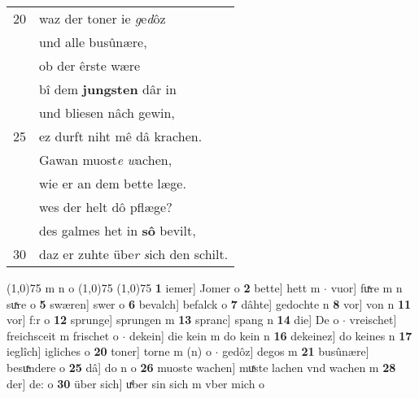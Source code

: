 \documentclass[8pt,a4paper,notitlepage]{article}
\begin{document}
\begin{table}[ht]
\begin{minipage}[t]{0.5\linewidth}
\begin{tabular}{rl}
20 & waz der toner ie \textit{g}e\textit{d}ôz\\ 
 & und alle busûnære,\\ 
 & ob der êrste wære\\ 
 & bî dem \textbf{jungsten} dâr in\\ 
 & und bliesen nâch gewin,\\ 
25 & ez durft niht mê dâ krachen.\\ 
 & Gawan muost\textit{e} \textit{w}achen,\\ 
 & wie er an dem bette læge.\\ 
 & wes der helt dô pflæge?\\ 
 & des galmes het in \textbf{sô} bevilt,\\ 
30 & daz er zuhte übe\textit{r} \textit{s}ich den schilt.\\ 
\end{tabular}
\scriptsize
\line(1,0){75} \newline
m n o \newline
\line(1,0){75} \newline
\newline
\line(1,0){75} \newline
\textbf{1} iemer] Jomer o \textbf{2} bette] hett m  $\cdot$ vuor] fuͯre m n suͯre o \textbf{5} swæren] swer o \textbf{6} bevalch] befalck o \textbf{7} dâhte] gedochte n \textbf{8} vor] von n \textbf{11} vor] f:r o \textbf{12} sprunge] sprungen m \textbf{13} spranc] spang n \textbf{14} die] De o  $\cdot$ vreischet] freichsceit m frischet o  $\cdot$ dekein] die kein m do kein n \textbf{16} dekeinez] do keines n \textbf{17} ieglîch] igliches o \textbf{20} toner] torne m (n) o  $\cdot$ gedôz] degos m \textbf{21} busûnære] besuͯndere o \textbf{25} dâ] do n o \textbf{26} muoste wachen] muͯste lachen vnd wachen m \textbf{28} der] de: o \textbf{30} über sich] uͯber sin sich m vber mich o \newline
\end{minipage}
\end{table}
\newpage
\end{document}
